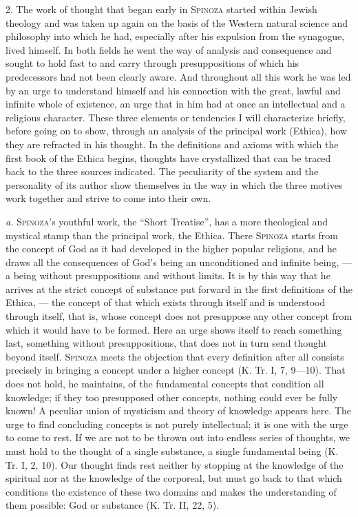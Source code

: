 \documentclass[12pt]{article}
\newcommand{\opage}[1]{\marginnote{\footnotesize\textit{[#1]}}}
\begin{document}
2. The work of thought that began early in \textsc{Spinoza} started within Jewish
theology and was taken up again on the basis of the Western natural science and
philosophy into which he had, especially after his expulsion from the synagogue,
lived himself. In both fields he went the way of analysis and consequence and
sought to hold fast to and carry through presuppositions of which his
predecessors had not been clearly aware. And throughout all this work he was led
by an urge to understand himself and his connection with the great, lawful and
infinite whole of existence, an urge that in him had at once an intellectual and
a religious character. These three elements or tendencies I will characterize
briefly, before going on to show, through an analysis of the principal work
(Ethica), how they are refracted in his thought. In the definitions and axioms
with which the first book of the Ethica begins, thoughts have crystallized that
can be traced back to the three sources indicated. The peculiarity of the system
and the personality of its author show themselves in the way in which the three
motives work together and strive to come into their own.

\textit{a.} \textsc{Spinoza}'s youthful work, the ``Short Treatise'', has a more
theological and mystical stamp than the principal work, the Ethica. There
\textsc{Spinoza} starts from the concept of God as it had developed in the higher
popular religions, and he draws all the consequences of God's being an
unconditioned and infinite being, --- a being without presuppositions and without
limits. It is by this way that he arrives at the strict concept of substance put
forward in the first definitions of the Ethica, --- the concept of that which
exists through itself and is understood through itself, that is, whose concept
does not presuppose any other concept from which it would have to be formed. Here
an urge shows itself to reach something last, something without presuppositions,
that does not in turn send thought beyond itself. \textsc{Spinoza} meets the
objection that every definition after all consists precisely in bringing a
concept under a higher concept (K. Tr. I, 7, 9---10). That does not hold, he
maintains, of the fundamental concepts that condition all knowledge;
\opage{6}if they too presupposed other concepts, nothing could ever be fully known!
A peculiar union of mysticism and theory of knowledge appears here. The urge to
find concluding concepts is not purely intellectual; it is one with the urge to
come to rest. If we are not to be thrown out into endless series of thoughts, we
must hold to the thought of a single substance, a single fundamental being (K.
Tr. I, 2, 10). Our thought finds rest neither by stopping at the knowledge of the
spiritual nor at the knowledge of the corporeal, but must go back to that which
conditions the existence of these two domains and makes the understanding of them
possible: God or substance (K. Tr. II, 22, 5).
\end{document}
